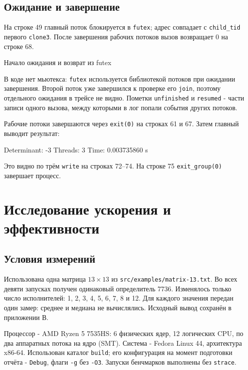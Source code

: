 \documentclass[12pt,a4paper]{article}
\begin{document}
\subsection{Ожидание и завершение}
На строке 49 главный поток блокируется в \texttt{futex}; адрес совпадает с \texttt{child\_tid} первого \texttt{clone3}. После завершения рабочих потоков вызов возвращает 0 на строке 68.
\begin{listingblock}{Начало ожидания и возврат из futex}
\end{listingblock}

В коде нет мьютекса: \texttt{futex} используется библиотекой потоков при ожидании завершения. Второй поток уже завершился к проверке его \texttt{join}, поэтому отдельного ожидания в трейсе не видно. Пометки \texttt{unfinished} и \texttt{resumed} - части записи одного вызова, между которыми в лог попали события других потоков.

Рабочие потоки завершаются через \texttt{exit(0)} на строках 61 и 67. Затем главный выводит результат:
\begin{terminal}
Determinant: -3
Threads: 3
Time: 0.003735860 s
\end{terminal}

Это видно по трём \texttt{write} на строках 72--74. На строке 75 \texttt{exit\_group(0)} завершает процесс.

\section{Исследование ускорения и эффективности}
\subsection{Условия измерений}
Использована одна матрица $13\times13$ из \texttt{src/examples/matrix-13.txt}. Во всех девяти запусках получен одинаковый определитель 7736. Изменялось только число исполнителей: 1, 2, 3, 4, 5, 6, 7, 8 и 12. Для каждого значения передан один замер: среднее и медиана не вычислялись. Исходный вывод сохранён в приложении В.

Процессор - AMD Ryzen 5 7535HS: 6 физических ядер, 12 логических CPU, по два аппаратных потока на ядро (SMT). Система - Fedora Linux 44, архитектура x86-64. Использован каталог \texttt{build}; его конфигурация на момент подготовки отчёта - \texttt{Debug}, флаги \texttt{-g} без \texttt{-O3}. Запуски бенчмарков выполнены без \texttt{strace}.
\end{document}

